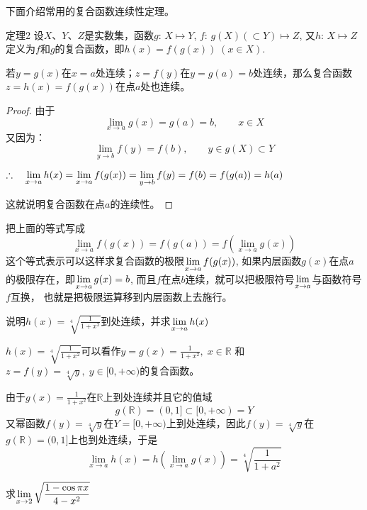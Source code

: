下面介绍常用的复合函数连续性定理。
\begin{blk}
{定理2} 设$X$、$Y$、$Z$是实数集，函数$g:\,X\mapsto Y$, $f:\, g(X)(\subset Y)\mapsto Z$, 又$h:\, X\mapsto Z$定义为$f$和$g$的复合函数，即$h(x)=f (g (x) )\;  (x\in X)$.

若$y=g(x)$在$x=a$处连续；$z=f(y)$在$y=g(a)=b$处连续，那么复合函数$z=h(x)=f(g(x))$在点$a$处也连续。
\end{blk}

\begin{proof}
由于
\begin{equation}
    \lim_{x\to a} g(x)=g(a)=b,\qquad x\in X
\end{equation}    
又因为：
\begin{equation}
    \lim_{y\to b} f(y)=f(b),\qquad y\in g(X)\subset Y
\end{equation}

$\therefore\quad \displaystyle\lim_{x\to a}h(x)=\displaystyle\lim_{x\to a}f(g(x))=\displaystyle\lim_{y\to b}f(y)=f(b)=f(g(a))=h(a)$

这就说明复合函数在点$a$的连续性。
\end{proof}

把上面的等式写成
\[\lim_{x\to a}f (g (x) ) =f (g (a) ) =f \left(\lim_{x\to a} g(x) \right)\]
这个等式表示可以这样求复合函数的极限$\displaystyle\lim_{x\to a}f(g(x))$, 
如果内层函数$g(x)$在点$a$的极限存在，即$\displaystyle\lim_{x\to a}g(x)=b$, 
而且$f$在点$b$连续，就可以把极限符号$\displaystyle\lim_{x\to a}$与函数符号$f$互换，
也就是把极限运算移到内层函数上去施行。

\begin{example}
    说明$h(x)=\sqrt[4]{\frac{1}{1+x^2}}$到处连续，并求$\displaystyle\lim_{x\to a}h(x)$
\end{example}

\begin{solution}
    $h(x)=\sqrt[4]{\frac{1}{1+x^2}}$可以看作$y=g(x)=\frac{1}{1+x^2},\; x\in\mathbb{R}$
和$z=f(y)=\sqrt[4]{y},\; y\in [0,+\infty)$的复合函数。

由于$g(x)=\frac{1}{1+x^2}$在$\mathbb{R}$上到处连续并且它的值域
\[g(\mathbb{R})=(0,1]\subset [0,+\infty)=Y\]
又幂函数$f(y)=\sqrt[4]{y}$在$Y=[0,+\infty)$上到处连续，因此$f(y)=\sqrt[4]{y}$在$g(\mathbb{R})=(0,1]$上也到处连续，于是
\[\lim_{x\to a}h(x)=h\left(\lim_{x\to a}g(x)\right)=\sqrt[4]{\frac{1}{1+a^2}}\]
\end{solution}


\begin{example}
    求$\displaystyle\lim_{x\to 2}\sqrt{\dfrac{1-\cos\pi x}{4-x^2}}$
\end{example}

